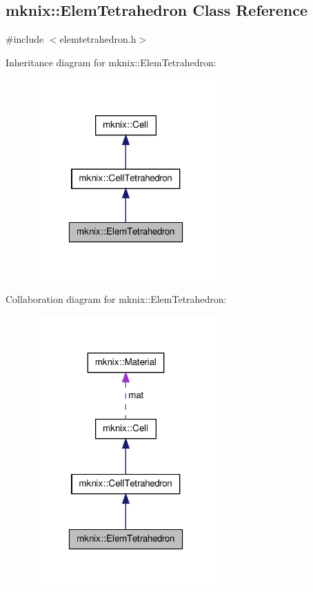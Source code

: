 \hypertarget{classmknix_1_1_elem_tetrahedron}{\subsection{mknix\-:\-:Elem\-Tetrahedron Class Reference}
\label{classmknix_1_1_elem_tetrahedron}
}


{\ttfamily \#include $<$elemtetrahedron.\-h$>$}



Inheritance diagram for mknix\-:\-:Elem\-Tetrahedron\-:\nopagebreak
\begin{figure}[H]
\begin{center}
\leavevmode
\includegraphics[width=202pt]{d9/db3/classmknix_1_1_elem_tetrahedron__inherit__graph}
\end{center}
\end{figure}


Collaboration diagram for mknix\-:\-:Elem\-Tetrahedron\-:\nopagebreak
\begin{figure}[H]
\begin{center}
\leavevmode
\includegraphics[width=202pt]{d4/d93/classmknix_1_1_elem_tetrahedron__coll__graph}
\end{center}
\end{figure}
